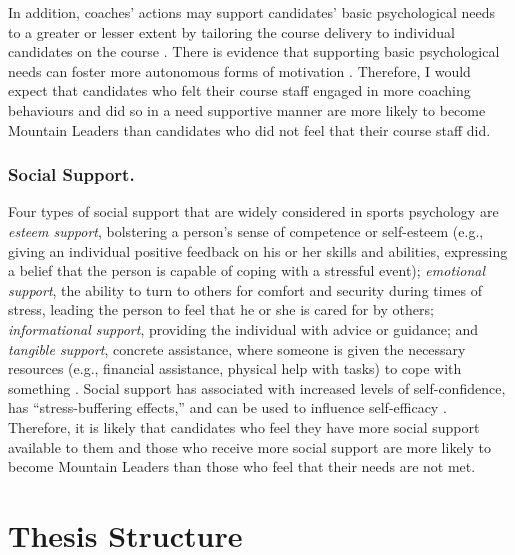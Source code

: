 \documentclass[
  12pt,
  a4paper,
]{book}
\begin{document}
In addition, coaches' actions may support candidates' basic psychological needs to a greater or lesser extent by tailoring the course delivery to individual candidates on the course \citep{Arthur2019, Markland2010}. There is evidence that supporting basic psychological needs can foster more autonomous forms of motivation \citep{Markland2010, Silva2010}. Therefore, I would expect that candidates who felt their course staff engaged in more coaching behaviours and did so in a need supportive manner are more likely to become Mountain Leaders than candidates who did not feel that their course staff did.

\hypertarget{social-support.}{%
\subsubsection{Social Support.}\label{social-support.}}

Four types of social support that are widely considered in sports psychology are \emph{esteem support}, bolstering a person's sense of competence or self-esteem (e.g., giving an individual positive feedback on his or her skills and abilities, expressing a belief that the person is capable of coping with a stressful event); \emph{emotional support}, the ability to turn to others for comfort and security during times of stress, leading the person to feel that he or she is cared for by others; \emph{informational support}, providing the individual with advice or guidance; and \emph{tangible support}, concrete assistance, where someone is given the necessary resources (e.g., financial assistance, physical help with tasks) to cope with something \citep[e.g.,][]{Cutrona1990a, Cutrona1990b, Freeman2010, Freeman2014, Rees2007a, Rees2007}. Social support has associated with increased levels of self-confidence, has ``stress-buffering effects,'' and can be used to influence self-efficacy \citep{Rees2007, Freeman2014, Samson2011}. Therefore, it is likely that candidates who feel they have more social support available to them and those who receive more social support are more likely to become Mountain Leaders than those who feel that their needs are not met.

\hypertarget{thesis-structure}{%
\section{Thesis Structure}\label{thesis-structure}}
\end{document}
